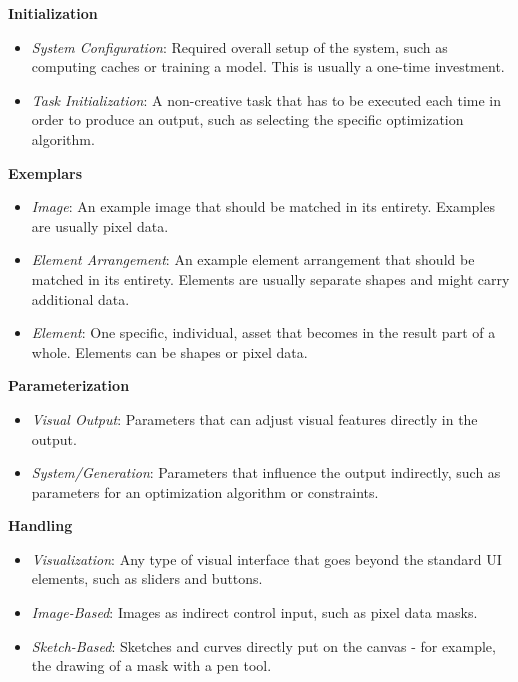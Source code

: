 \noindent\textbf{Initialization}
\begin{itemize}
    \item \textit{System Configuration}: Required overall setup of the system, such as computing caches or training a model. This is usually a one-time investment.
    \item \textit{Task Initialization}: A non-creative task that has to be executed each time in order to produce an output, such as selecting the specific optimization algorithm.
\end{itemize}

\noindent\textbf{Exemplars}

\begin{itemize}
    \item \textit{Image}: An example image that should be matched in its entirety. Examples are usually pixel data.
    \item \textit{Element Arrangement}: An example element arrangement that should be matched in its entirety. Elements are usually separate shapes and might carry additional data.
    \item \textit{Element}: One specific, individual, asset that becomes in the result part of a whole. Elements can be shapes or pixel data.
\end{itemize}

\noindent\textbf{Parameterization}

\begin{itemize}
    \item \textit{Visual Output}: Parameters that can adjust visual features directly in the output.
    \item \textit{System/Generation}: Parameters that influence the output indirectly, such as parameters for an optimization algorithm or constraints.
\end{itemize}

\noindent\textbf{Handling}

\begin{itemize}
    \item \textit{Visualization}: Any type of visual interface that goes beyond the standard UI elements, such as sliders and buttons.
    \item \textit{Image-Based}: Images as indirect control input, such as pixel data masks.
    \item \textit{Sketch-Based}: Sketches and curves directly put on the canvas - for example, the drawing of a mask with a pen tool.
\end{itemize}

